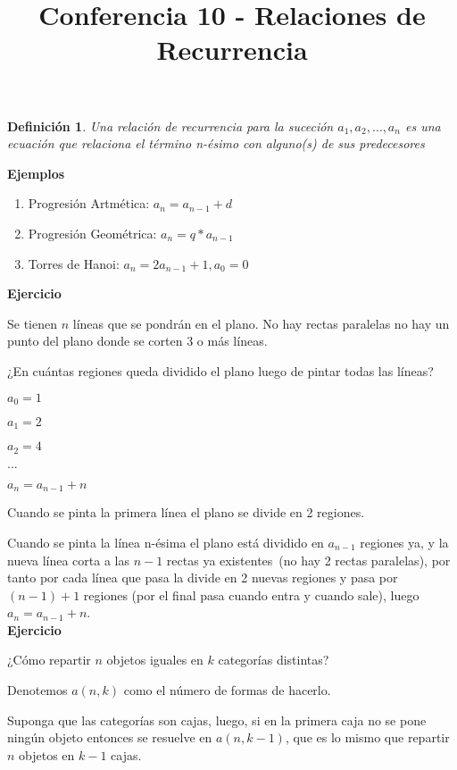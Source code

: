 \documentclass[a4paper,12pt]{report}
\title{Conferencia 10 - Relaciones de Recurrencia}
\author{}
\newtheorem*{dfn}{Definición}
\begin{document}
\maketitle



\begin{dfn}
 Una relación de recurrencia para la suceción $a_1, a_2,\dots, a_n$ es una ecuación que relaciona el término n-ésimo con alguno(s) de sus predecesores
\end{dfn}

\textbf{Ejemplos}

\begin{enumerate}
 \item Progresión Artmética: $a_n=a_{n-1}+d$
 \item Progresión Geométrica: $a_n=q*a_{n-1}$
 \item Torres de Hanoi: $a_n = 2a_{n-1}+1,a_0=0$
\end{enumerate}

\textbf{Ejercicio}

Se tienen $n$ líneas que se pondrán en el plano. No hay rectas paralelas no
hay un punto del plano donde se corten 3 o más líneas.

¿En cuántas regiones queda dividido el plano luego de pintar todas las líneas?

$a_0=1$

$a_1=2$

$a_2=4$

$\dots$

$a_n=a_{n-1}+n$

Cuando se pinta la primera línea el plano se divide en 2 regiones.

Cuando se pinta la línea n-ésima el plano está dividido en $a_{n-1}$ regiones ya, y la nueva línea corta a las $n-1$ rectas ya existentes~(no hay 2 rectas paralelas), por tanto por cada l\'inea que pasa la divide en 2 nuevas regiones y pasa por $(n-1)+1$ regiones (por el final pasa cuando entra y cuando sale), luego $a_n=a_{n-1}+n$.\\


\textbf{Ejercicio}

¿Cómo repartir $n$ objetos iguales en $k$ categorías distintas?

Denotemos $a(n,k)$ como el número de formas de hacerlo.

Suponga que las categorías son cajas, luego, si en la primera caja no se pone ningún objeto entonces se resuelve en $a(n,k-1)$, que es lo mismo que repartir $n$ objetos en $k-1$ cajas.
\end{document}
